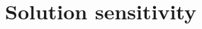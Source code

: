 \section{Solution sensitivity}

\def\incrabsvars{\Delta \absvars}
\def\incrlagmultsneq{\Delta \lagmultsneq}
\def\incrlagmultseq{\Delta \lagmultseq}

\def\PPLagfuncBYabsvars{\ppdfrac{\Lagfunc}{\absvars}}
\def\PLagfuncBYabsvars{\pdfrac{\Lagfunc}{\absvars}}
\def\PneqctrBYabsvars{\pdfrac{\neqctr}{\absvar}}
\def\PeqctrBYabsvars{\pdfrac{\eqctr}{\absvar}}

\def\DoptcritJBYabsvarI{\frac{d \optcrit_{j}}{d \absvar_{i}}}
\def\PoptcritJBYabsvarI{\pdfrac{\optcrit_{j}}{\absvar_{i}}}

\def\PoptcritJBYstructdisp{\pdfrac{\optcrit_{j}}{\structdisp}}
\def\PoptcritJBYmms       {\pdfrac{\optcrit_{j}}{\mms}}
\def\PoptcritJBYfstate    {\pdfrac{\optcrit_{j}}{\fstate}}

\def\DoptcritJBYstructdisp{\tfrac{\optcrit_{j}}{\structdisp}}
\def\DoptcritJBYmms       {\tfrac{\optcrit_{j}}{\mms}}
\def\DoptcritJBYfstate    {\tfrac{\optcrit_{j}}{\fstate}}

\def\DstructdispBYabsvarI{\frac{d \structdisp}{d \absvar_{i}} }
\def\DmmsBYabsvarI       {\frac{d \mms       }{d \absvar_{i}} }
\def\DfstateBYabsvarI    {\frac{d \fstate    }{d \absvar_{i}} }

\def\PstructdispBYabsvarI{\pdfrac{d \structdisp}{d \absvar_{i}} }
\def\PmmsBYabsvarI       {\pdfrac{d \mms       }{d \absvar_{i}} }
\def\PfstateBYabsvarI    {\pdfrac{d \fstate    }{d \absvar_{i}} }

\def\PEOSstructBYabsvarI{\pdfrac{\EOSstruct} {\absvar_i}}
\def\PEOSmeshBYabsvarI  {\pdfrac{\EOSmesh}  {\absvar_i}}

\def\DEOSstructBYabsvarI{\tfrac{\EOSstruct} {\absvar_i}}
\def\DEOSmeshBYabsvarI  {\tfrac{\EOSmesh}  {\absvar_i}}

\def\PEOSstructBYstructdisp{\pdfrac{\EOSstruct} {\structdisp}}
\def\PEOSstructBYmms{\pdfrac{\EOSstruct}{\mms}}
\def\PEOSstructBYfstate    {\pdfrac{\EOSstruct}{\fstate}}

\def\PEOSmeshBYstructdisp{\pdfrac{\EOSmesh}{\structdisp}}
\def\PEOSmeshBYmms       {\pdfrac{\EOSmesh} {\mms}}
\def\PEOSmeshBYfstate    {\vec{0}}

\def\PEOSfluidBYstructdisp{\vec{0}}

